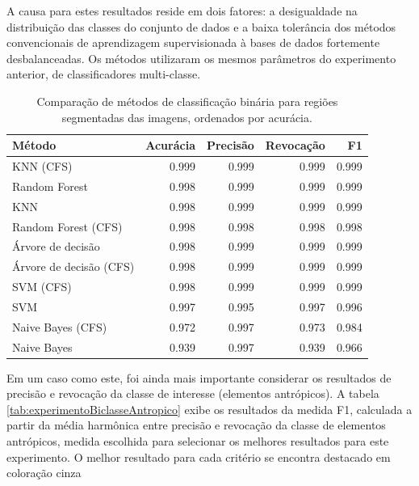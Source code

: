 A causa para estes resultados reside em dois fatores: a desigualdade na distribuição das classes do conjunto de dados e a baixa tolerância dos métodos convencionais de aprendizagem supervisionada à bases de dados fortemente desbalanceadas. Os métodos utilizaram os mesmos parâmetros do experimento anterior, de classificadores multi-classe.

\begin{table}[h]
\centering
	\begin{tabulary}{\linewidth}{|L|R|R|R|R|}
		\hline
		\textbf{Método} & \textbf{Acurácia} & \textbf{Precisão} & \textbf{Revocação} & \textbf{F1} \\ \hline
		KNN (CFS)               & 0.999 & 0.999 & 0.999 & 0.999 \\ \hline
		Random Forest           & 0.998 & 0.999 & 0.999 & 0.999 \\ \hline
		KNN                     & 0.998 & 0.999 & 0.999 & 0.999 \\ \hline
		Random Forest (CFS)     & 0.998 & 0.998 & 0.998 & 0.998 \\ \hline
		Árvore de decisão       & 0.998 & 0.999 & 0.999 & 0.999 \\ \hline
		Árvore de decisão (CFS) & 0.998 & 0.999 & 0.999 & 0.999 \\ \hline
		SVM (CFS)               & 0.998 & 0.999 & 0.999 & 0.999 \\ \hline
		SVM                     & 0.997 & 0.995 & 0.997 & 0.996 \\ \hline
		Naive Bayes (CFS)       & 0.972 & 0.997 & 0.973 & 0.984 \\ \hline
		Naive Bayes             & 0.939 & 0.997 & 0.939 & 0.966 \\ \hline
	\end{tabulary}
\caption{Comparação de métodos de classificação binária para regiões segmentadas das imagens, ordenados por acurácia.}
\label{tab:experimentoBiclasse}
\end{table}

Em um caso como este, foi ainda mais importante considerar os resultados de precisão e revocação da classe de interesse (elementos antrópicos). A tabela \ref{tab:experimentoBiclasseAntropico} exibe os resultados da medida F1, calculada a partir da média harmônica entre precisão e revocação da classe de elementos antrópicos, medida escolhida para selecionar os melhores resultados para este experimento. O melhor resultado para cada critério se encontra destacado em coloração cinza


